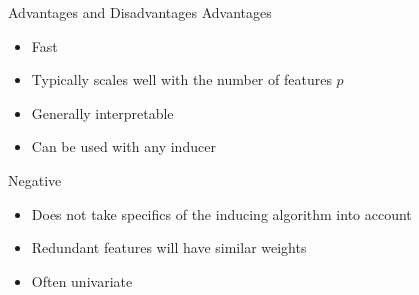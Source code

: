 \documentclass[11pt,compress,t,notes=noshow, xcolor=table]{beamer}
\begin{document}
\begin{vbframe}{Advantages and Disadvantages}
    Advantages
    \begin{itemize}
        \item Fast
        \item Typically scales well with the number of features $p$
        \item Generally interpretable
        \item Can be used with any inducer
    \end{itemize}
    Negative
    \begin{itemize}
        \item Does not take specifics of the inducing algorithm into account
        \item Redundant features will have similar weights
        \item Often univariate
    \end{itemize}
\end{vbframe}

\endlecture
\end{document}
